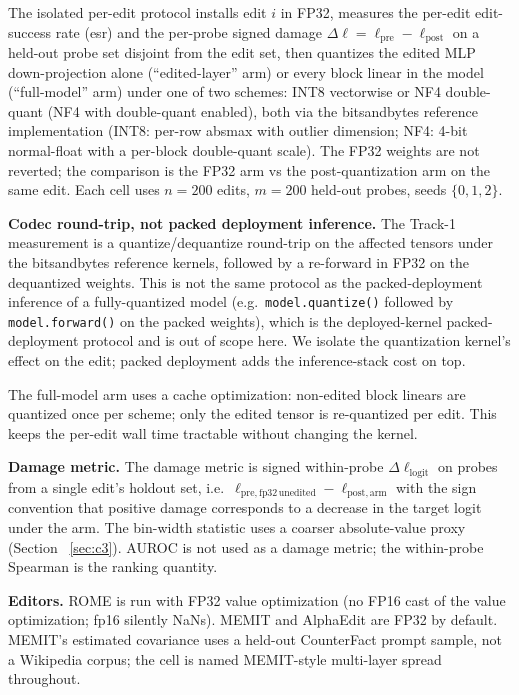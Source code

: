 \documentclass[preprint,12pt]{elsarticle}
\begin{document}
The isolated per-edit protocol installs edit $i$ in FP32, measures the per-edit
edit-success rate (esr) and the per-probe signed damage $\Delta\ell = \ell_{\mathrm{pre}}
- \ell_{\mathrm{post}}$ on a held-out probe set disjoint from the edit set, then
quantizes the edited MLP down-projection alone (``edited-layer'' arm) or every block
linear in the model (``full-model'' arm) under one of two schemes: INT8 vectorwise
or NF4 double-quant (NF4 with double-quant enabled), both via the bitsandbytes
reference implementation (INT8: per-row absmax with outlier dimension; NF4: 4-bit
normal-float with a per-block double-quant scale). The FP32 weights are not reverted;
the comparison is the FP32 arm vs the post-quantization arm on the same edit. Each
cell uses $n = 200$ edits, $m = 200$ held-out probes, seeds $\{0, 1, 2\}$.

\textbf{Codec round-trip, not packed deployment inference.} The Track-1
measurement is a quantize/dequantize round-trip on the affected tensors under
the bitsandbytes reference kernels, followed by a re-forward in FP32 on the
dequantized weights. This is not the same protocol as the packed-deployment
inference of a fully-quantized model (e.g.\ \texttt{model.quantize()} followed
by \texttt{model.forward()} on the packed weights), which is the deployed-kernel
packed-deployment protocol and is out of scope here. We isolate the quantization
kernel's effect on the edit; packed deployment adds the inference-stack cost on top.

The full-model arm uses a cache optimization: non-edited block linears are quantized
once per scheme; only the edited tensor is re-quantized per edit. This keeps the
per-edit wall time tractable without changing the kernel.

\textbf{Damage metric.} The damage metric is signed within-probe
$\Delta\ell_{\mathrm{logit}}$ on probes from a single edit's holdout set, i.e.\
$\ell_{\mathrm{pre},\mathrm{fp32\,unedited}} - \ell_{\mathrm{post},\mathrm{arm}}$ with
the sign convention that positive damage corresponds to a decrease in the target logit
under the arm. The bin-width statistic uses a coarser absolute-value proxy (Section~
\ref{sec:c3}). AUROC is not used as a damage metric; the within-probe Spearman is the
ranking quantity.

\textbf{Editors.} ROME is run with FP32 value optimization (no FP16 cast of the value
optimization; fp16 silently NaNs). MEMIT and AlphaEdit are FP32 by default. MEMIT's
estimated covariance uses a held-out CounterFact prompt sample, not a Wikipedia
corpus; the cell is named MEMIT-style multi-layer spread throughout.
\end{document}
